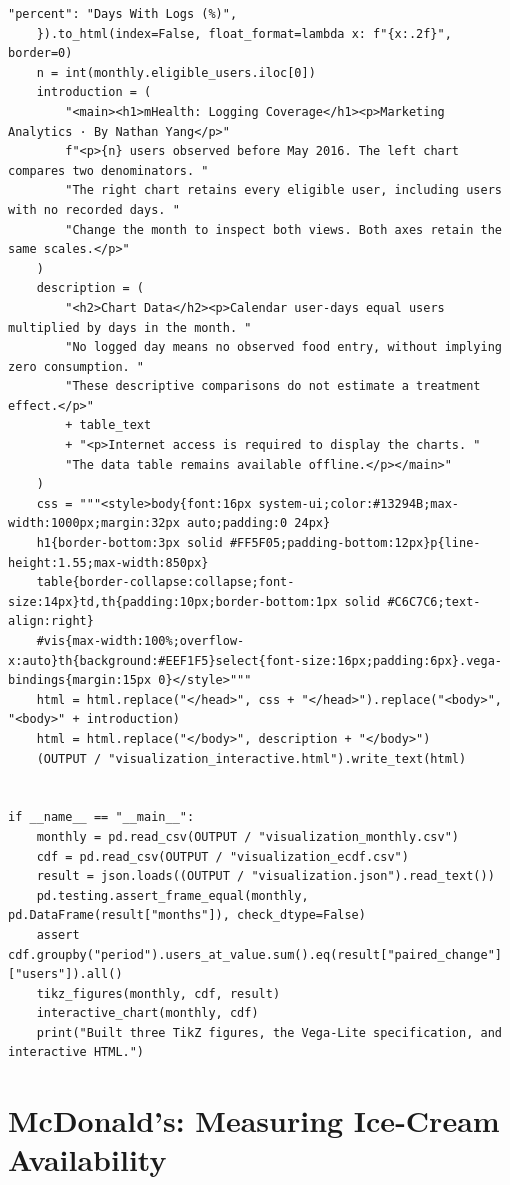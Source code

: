 \begin{Verbatim}[breaklines,breakanywhere,fontsize=\small]
        "percent": "Days With Logs (%)",
    }).to_html(index=False, float_format=lambda x: f"{x:.2f}", border=0)
    n = int(monthly.eligible_users.iloc[0])
    introduction = (
        "<main><h1>mHealth: Logging Coverage</h1><p>Marketing Analytics · By Nathan Yang</p>"
        f"<p>{n} users observed before May 2016. The left chart compares two denominators. "
        "The right chart retains every eligible user, including users with no recorded days. "
        "Change the month to inspect both views. Both axes retain the same scales.</p>"
    )
    description = (
        "<h2>Chart Data</h2><p>Calendar user-days equal users multiplied by days in the month. "
        "No logged day means no observed food entry, without implying zero consumption. "
        "These descriptive comparisons do not estimate a treatment effect.</p>"
        + table_text
        + "<p>Internet access is required to display the charts. "
        "The data table remains available offline.</p></main>"
    )
    css = """<style>body{font:16px system-ui;color:#13294B;max-width:1000px;margin:32px auto;padding:0 24px}
    h1{border-bottom:3px solid #FF5F05;padding-bottom:12px}p{line-height:1.55;max-width:850px}
    table{border-collapse:collapse;font-size:14px}td,th{padding:10px;border-bottom:1px solid #C6C7C6;text-align:right}
    #vis{max-width:100%;overflow-x:auto}th{background:#EEF1F5}select{font-size:16px;padding:6px}.vega-bindings{margin:15px 0}</style>"""
    html = html.replace("</head>", css + "</head>").replace("<body>", "<body>" + introduction)
    html = html.replace("</body>", description + "</body>")
    (OUTPUT / "visualization_interactive.html").write_text(html)


if __name__ == "__main__":
    monthly = pd.read_csv(OUTPUT / "visualization_monthly.csv")
    cdf = pd.read_csv(OUTPUT / "visualization_ecdf.csv")
    result = json.loads((OUTPUT / "visualization.json").read_text())
    pd.testing.assert_frame_equal(monthly, pd.DataFrame(result["months"]), check_dtype=False)
    assert cdf.groupby("period").users_at_value.sum().eq(result["paired_change"]["users"]).all()
    tikz_figures(monthly, cdf, result)
    interactive_chart(monthly, cdf)
    print("Built three TikZ figures, the Vega-Lite specification, and interactive HTML.")
\end{Verbatim}

\hypertarget{M02-mcdonalds-measuring-ice-cream-availability}{%
\section{McDonald's: Measuring Ice-Cream
Availability}\label{M02-mcdonalds-measuring-ice-cream-availability}}

